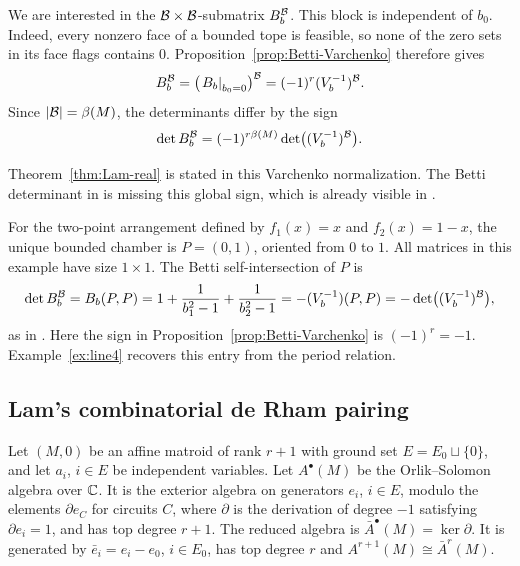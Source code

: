 We are interested in the $\mathcal B \times \mathcal B$-submatrix $B_b^{\mathcal B}$.
This block is independent of $b_0$. Indeed, every nonzero face of a
bounded tope is feasible, so none of the zero sets in its face flags
contains $0$. Proposition~\ref{prop:Betti-Varchenko} therefore gives
\[
 B_b^{\mathcal B}=\left( \left.B_b\right|_{b_0=0}\right)^\mathcal B = (-1)^r(V_b^{-1})^{\mathcal B}.
\]
Since $|\mathcal B|=\beta(M)$, the determinants differ by the sign
\[
 \det B_b^{\mathcal B}=(-1)^{r\beta(M)}
                 \det\bigl((V_b^{-1})^{\mathcal B}\bigr).
\]
\begin{remark}
Theorem~\ref{thm:Lam-real} is stated in this Varchenko normalization.
The Betti determinant in \cite[Conjecture 8.10]{Lam} is missing this global sign, which is already visible
in \cite[Example 8.11]{Lam}.
\end{remark}
\begin{example}\label{ex:line}
For the two-point arrangement defined by $f_1(x)=x$ and $f_2(x)=1-x$,
the unique bounded chamber is $P=(0,1)$, oriented from $0$ to $1$.
All matrices in this example have size $1\times1$.
The Betti self-intersection of $P$ is
\[
 \det B_b^{\mathcal B}=B_b(P,P)=1+\frac{1}{b_1^2-1}+\frac{1}{b_2^2-1}
     =-(V_b^{-1})(P,P) = -\det\bigl((V_b^{-1})^{\mathcal B}\bigr),
\]
as in \cite[Example 14.2]{Lam}. Here the sign in
Proposition~\ref{prop:Betti-Varchenko} is $(-1)^r=-1$.
Example~\ref{ex:line4} recovers this entry from the
period relation.
\end{example}
\subsection{Lam's combinatorial de Rham pairing}\label{subsec:deRham-pairing}
Let $(M,0)$ be an affine matroid of rank $r+1$ with ground set $E = E_0 \sqcup \{0\}$, and let $a_i$, $i\in E$ be independent variables.
Let $A^{\bullet}(M)$ be the Orlik--Solomon algebra over $\mathbb C$.
It is the exterior algebra on generators $e_i$, $i\in E$, modulo
the elements $\partial e_C$ for circuits $C$, where $\partial$ is
the derivation of degree $-1$ satisfying $\partial e_i=1$, and has top
degree $r+1$.
The reduced algebra is $\bar A^{\bullet}(M)=\ker\partial$.
It is generated by $\bar e_i=e_i-e_0$, $i\in E_0$, has top
degree $r$ and $A^{r+1}(M) \cong \bar A^r(M)$.  

